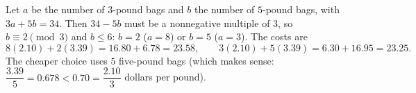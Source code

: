 Let $a$ be the number of $3$-pound bags and $b$ the number of $5$-pound bags, with $3a+5b=34$. Then $34-5b$ must be a nonnegative multiple of $3$, so $b\equiv2\pmod3$ and $b\le6$: $b=2$ ($a=8$) or $b=5$ ($a=3$). The costs are
\[
8(2.10)+2(3.39)=16.80+6.78=23.58,\qquad 3(2.10)+5(3.39)=6.30+16.95=23.25 .
\]
The cheaper choice uses $\boxed{5}$ five-pound bags (which makes sense: $\dfrac{3.39}{5}=0.678<0.70=\dfrac{2.10}{3}$ dollars per pound).
